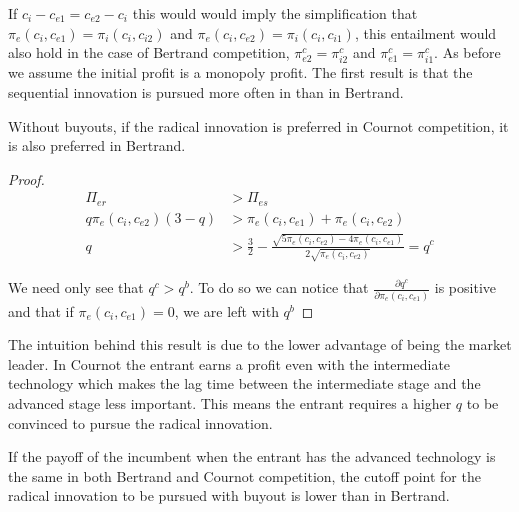 If $c_i-c_{e1}=c_{e2}-c_i$ this would would imply the simplification that $\pi_{e}(c_i,c_{e1})=\pi_{i}(c_{i},c_{i2})$ and $\pi_{e}(c_i,c_{e2})=\pi_{i}(c_{i},c_{i1})$, this entailment would also hold in the case of Bertrand competition, $\pi_{e2}^{c}=\pi_{i2}^{c}$ and $\pi_{e1}^{c}=\pi_{i1}^{c}$. As before we assume the initial profit is a monopoly profit. The first result is that the sequential innovation is pursued more often in than in Bertrand.

\begin{proposition}
Without buyouts, if the radical innovation is preferred in Cournot competition, it is also preferred in Bertrand. 
\end{proposition}

\begin{proof}
\begin{align*}
\Pi_{er}&>\Pi_{es} \\
q \pi_{e}(c_i,c_{e2}) (3-q) &> \pi_{e}(c_i,c_{e1})+\pi_{e}(c_i,c_{e2}) \\
q&> 
 \frac{3}{2}-\frac{ \sqrt{5 \pi_{e}(c_i,c_{e2})-4 \pi_{e}(c_i,c_{e1})}}{2 \sqrt{\pi_{e}(c_i,c_{e2})}}=q^{c}
\end{align*}

We need only see that $q^{c}>q^{b}$. To do so we can notice that $\frac{\partial q^c}{\partial \pi_{e}(c_i,c_{e1}) }$ is positive and that if $\pi_{e}(c_i,c_{e1})=0$, we are left with $q^{b}$
\end{proof}

The intuition behind this result is due to the lower advantage of being the market leader. In Cournot the entrant earns a profit even with the intermediate technology which makes the lag time between the intermediate stage and the advanced stage less important. This means the entrant requires a higher $q$ to be convinced to pursue the radical innovation.  

\begin{proposition}
If the payoff of the incumbent when the entrant has the advanced technology is the same in both Bertrand and Cournot competition, the cutoff point for the radical innovation to be pursued with buyout is lower than in Bertrand. 
\end{proposition}

